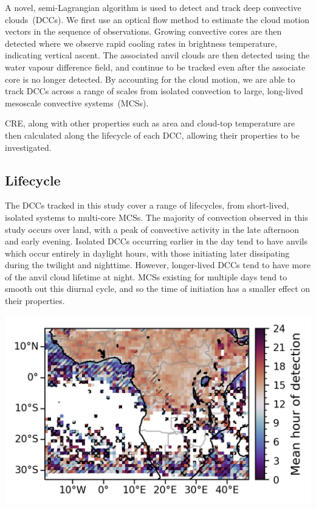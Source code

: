 \documentclass{tufte-handout}
\begin{document}
A novel, semi-Lagrangian algorithm is used to detect and track deep convective clouds~(DCCs).
We first use an optical flow method to estimate the cloud motion vectors in the sequence of observations.
Growing convective cores are then detected where we observe rapid cooling rates in brightness temperature, indicating vertical ascent.
The associated anvil clouds are then detected using the water vapour difference field, and continue to be tracked even after the associate core is no longer detected.
By accounting for the cloud motion, we are able to track DCCs across a range of scales from isolated convection to large, long-lived mesoscale convective systems~(MCSs).

CRE, along with other properties such as area and cloud-top temperature are then calculated along the lifecycle of each DCC, allowing their properties to be investigated.

\subsection{Lifecycle}



The DCCs tracked in this study cover a range of lifecycles, from short-lived, isolated systems to multi-core MCSs.
The majority of convection observed in this study occurs over land, with a peak of convective activity in the late afternoon and early evening.
Isolated DCCs occurring earlier in the day tend to have anvils which occur entirely in daylight hours, with those initiating later dissipating during the twilight and nighttime.
However, longer-lived DCCs tend to have more of the anvil cloud lifetime at night.
MCSs existing for multiple days tend to smooth out this diurnal cycle, and so the time of initiation has a smaller effect on their properties.

\begin{marginfigure}[-15\baselineskip]%
  \includegraphics[width=\linewidth]{figures/handout_fig3.png}
  \caption{The average time of detection in each 1\textdegree grid box. Locations with larger variance are shown hatched}
  \label{fig:marginfig}
\end{marginfigure}
\end{document}
